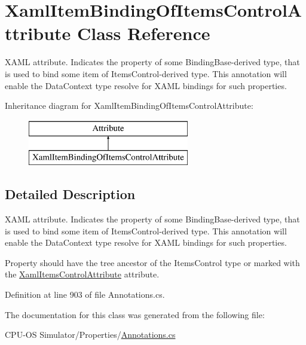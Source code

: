 \hypertarget{class_xaml_item_binding_of_items_control_attribute}{}\section{Xaml\+Item\+Binding\+Of\+Items\+Control\+Attribute Class Reference}
\label{class_xaml_item_binding_of_items_control_attribute}


X\+A\+M\+L attribute. Indicates the property of some {\ttfamily Binding\+Base}-\/derived type, that is used to bind some item of {\ttfamily Items\+Control}-\/derived type. This annotation will enable the {\ttfamily Data\+Context} type resolve for X\+A\+M\+L bindings for such properties.  


Inheritance diagram for Xaml\+Item\+Binding\+Of\+Items\+Control\+Attribute\+:\begin{figure}[H]
\begin{center}
\leavevmode
\includegraphics[height=2.000000cm]{class_xaml_item_binding_of_items_control_attribute}
\end{center}
\end{figure}


\subsection{Detailed Description}
X\+A\+M\+L attribute. Indicates the property of some {\ttfamily Binding\+Base}-\/derived type, that is used to bind some item of {\ttfamily Items\+Control}-\/derived type. This annotation will enable the {\ttfamily Data\+Context} type resolve for X\+A\+M\+L bindings for such properties. 

Property should have the tree ancestor of the {\ttfamily Items\+Control} type or marked with the \hyperlink{class_xaml_items_control_attribute}{Xaml\+Items\+Control\+Attribute} attribute. 

Definition at line 903 of file Annotations.\+cs.



The documentation for this class was generated from the following file\+:\begin{DoxyCompactItemize}
\item 
C\+P\+U-\/\+O\+S Simulator/\+Properties/\hyperlink{_annotations_8cs}{Annotations.\+cs}\end{DoxyCompactItemize}

